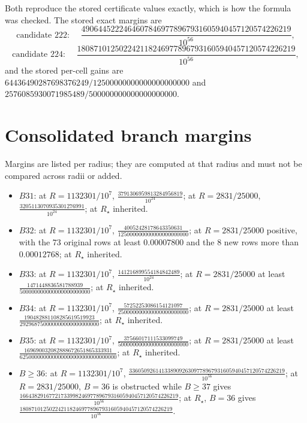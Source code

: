 Both reproduce the stored certificate values exactly, which is how the formula was checked. The
stored exact margins are
\[
\text{candidate 222: }\quad \frac{49064452224646078469778967931605940457120574226219}{10^{56}},
\]
\[
\text{candidate 224: }\quad \frac{1808710125022421182469778967931605940457120574226219}{10^{56}},
\]
and the stored per-cell gains are $64436490287698376249/12500000000000000000000$ and
$2576085930071985489/500000000000000000000$.

\section{Consolidated branch margins}

Margins are listed per radius; they are computed at that radius and must not be compared across
radii or added.

\begin{itemize}[leftmargin=1.4em,itemsep=2pt]
\item $B31$: at $R=1132301/10^{7}$,
$\frac{3791306959813284956819}{10^{24}}$; at $R=2831/25000$,
$\frac{3205113070935301276991}{10^{24}}$; at $R_\star$ inherited.
\item $B32$: at $R=1132301/10^{7}$,
$\frac{40052428178643350631}{125000000000000000000000}$; at $R=2831/25000$ positive, with the $73$
original rows at least $0.00007800$ and the $8$ new rows more than $0.00012768$; at $R_\star$
inherited.
\item $B33$: at $R=1132301/10^{7}$,
$\frac{141216899554184842489}{10^{24}}$; at $R=2831/25000$ at least
$\frac{1471448836581788939}{500000000000000000000000}$; at $R_\star$ inherited.
\item $B34$: at $R=1132301/10^{7}$,
$\frac{57252253086154121097}{250000000000000000000000}$; at $R=2831/25000$ at least
$\frac{190482881108285619519923}{292968750000000000000000000}$; at $R_\star$ inherited.
\item $B35$: at $R=1132301/10^{7}$,
$\frac{37566017111533099749}{500000000000000000000000}$; at $R=2831/25000$ at least
$\frac{169690032082888672651865333931}{625000000000000000000000000000000}$; at $R_\star$ inherited.
\item $B\ge36$: at $R=1132301/10^{7}$,
$\frac{33605092614133890926309778967931605940457120574226219}{10^{56}}$; at $R=2831/25000$,
$B=36$ is obstructed while $B\ge37$ gives
$\frac{166438291677217339982469778967931605940457120574226219}{10^{56}}$; at $R_\star$, $B=36$
gives
$\frac{1808710125022421182469778967931605940457120574226219}{10^{56}}$.
\end{itemize}

